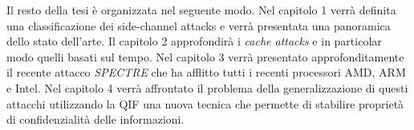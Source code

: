 	 Il resto della tesi è organizzata nel seguente modo. Nel capitolo 1 verrà definita una classificazione dei side-channel attacks e verrà presentata una panoramica dello stato dell'arte. Il capitolo 2 approfondirà i \emph{cache attacks} e in particolar modo quelli basati sul tempo.
	 Nel capitolo 3 verrà presentato approfonditamente il recente attacco \emph{SPECTRE} che ha afflitto tutti i recenti processori AMD, ARM e Intel.
	 Nel capitolo 4 verrà affrontato il problema della generalizzazione di questi attacchi utilizzando la \ac{QIF} una nuova tecnica che permette di stabilire proprietà di confidenzialità delle informazioni.
